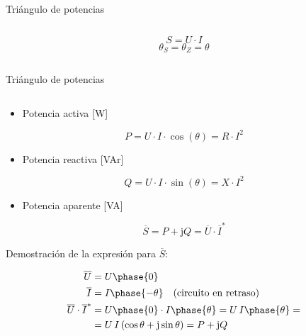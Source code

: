 \documentclass[aspectratio=169, usenames,svgnames,dvipsnames]{beamer}
\begin{document}
\begin{frame}{Triángulo de potencias}
\begin{columns}
\begin{column}{0.4\columnwidth}
    \[
        S = U \cdot I
    \]
    \[
        \theta_S = \theta_Z = \theta
    \]
    
    
    
    \end{column}
    \end{columns}
\end{frame}


\begin{frame}{Triángulo de potencias}
    \begin{columns} 
    \begin{column}{0.6\columnwidth}
    \vspace{2mm}
    \begin{itemize}
        \item Potencia \alert{activa} [W]
    \end{itemize}
    \[  
        \boxed{P = U\cdot I\cdot\cos(\theta) = R \cdot I^2}
    \]
    
    \begin{itemize}
        \item Potencia \alert{reactiva} [VAr]
    \end{itemize}
    \[
        \boxed{Q = U\cdot I\cdot\sin(\theta) = X \cdot I^2}
    \]
    
    \begin{itemize}
        \item Potencia \alert{aparente} [VA]
    \end{itemize}
    \[
        \boxed{\overline{S} = P + \mathrm{j}Q = \overline{U} \cdot \overline{I}^*}
    \]
    
    \hspace{8mm}Demostración de la expresión para $\overline{S}$:

    \vspace{-7mm}
    {\begin{align*}
        \overline{U} &= U\phase{0}\\
        \overline{I} &= I\phase{-\theta} \quad \text{(circuito en retraso)}\\
        \overline{U}\cdot\overline{I}^* &= U\phase{0} \cdot I\phase{\theta} = U\,I\phase{\theta}=\\
        &=U\,I\, (\cos\theta + \mathrm{j} \sin\theta) = P + \mathrm{j} Q
    \end{align*}}
    \end{column}
    

\end{columns}
\end{frame}
\end{document}
